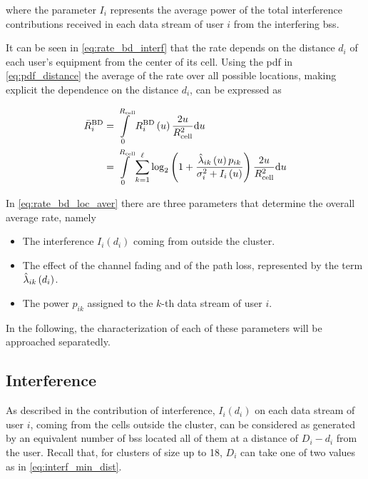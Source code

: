 \noindent
where the parameter $I_i$ represents the average power of the total interference
contributions received in each data stream of user $i$ from the interfering
\glspl{bs}.

It can be seen in \eqref{eq:rate_bd_interf} that the rate depends on the distance $d_i$ of each user's equipment from the center of its cell. Using the pdf in
\eqref{eq:pdf_distance} the average of the rate over all possible locations,
making explicit the dependence on the distance $d_i$, can be expressed as

\begin{equation} \label{eq:rate_bd_loc_aver}
\begin{aligned}
    \bar{R}_i^{\text{BD}} &= \int\limits_0^{R_{\text{cell}}} R_i^{\text{BD}}\left(u
    \right) \frac{2u}{R_{\text{cell}}^2} \text{d} u \\
    &= \int\limits_0^{R_{\text{cell}}} \sum\limits_{k = 1}^{\ell} \log_2 \left(1 +
    \frac{\hat{\lambda}_{ik}\left(u\right) p_{ik}}{\sigma_i^2 + I_i\left(u\right)}
    \right) \frac{2u}{R_{\text{cell}}^2} \text{d} u
\end{aligned}
\end{equation}

In \eqref{eq:rate_bd_loc_aver} there are three parameters that determine the
overall average rate, namely

\begin{itemize}
    \item The interference $I_i\left(d_i\right)$ coming from outside the
        cluster.
    \item The effect of the channel fading and of the path loss, represented by
        the term $\hat{\lambda}_{ik}\left(d_i\right)$.
    \item The power $p_{ik}$ assigned to the $k$-th data stream of user $i$.
\end{itemize}

In the following, the characterization of each of these parameters will be
approached separatedly.

\subsection{Interference}\label{ssec:achiev_rate_interf}

As described in  the contribution of interference,
$I_i\left(d_i\right)$ on each data stream of user $i$, coming from the cells
outside the cluster, can be considered as generated by an equivalent number of
\glspl{bs} located all of them at a distance of $D_i - d_i$ from the user.
Recall that, for clusters of size up to 18, $D_i$ can take one of two values as
in \eqref{eq:interf_min_dist}.

